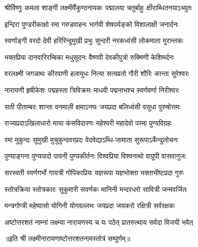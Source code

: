 
\twolineshloka
{श्रीर्विष्णुः कमला शार्ङ्गी लक्ष्मीर्वैकुण्ठनायकः}
{पद्मालया चतुर्बाहुः क्षीराब्धितनयाऽच्युतः}%

\twolineshloka
{इन्दिरा पुण्डरीकाक्षो रमा गरुडवाहनः}
{भार्गवी शेषपर्यङ्को विशालाक्षी जनार्दनः}%

\twolineshloka
{स्वर्णाङ्गी वरदो देवी हरिरिन्दुमुखी प्रभुः}
{सुन्दरी नरकध्वंसी लोकमाता मुरान्तकः}%

\twolineshloka
{भक्तप्रिया दानवारिरम्बिका मधुसूदनः}
{वैष्णवी देवकीपुत्रो रुक्मिणी केशिमर्दनः}%

\twolineshloka
{वरलक्ष्मी जगन्नाथः कीरवाणी हलायुधः}
{नित्या सत्यव्रतो गौरी शौरिः कान्ता सुरेश्वरः}

\twolineshloka
{नारायणी हृषीकेशः पद्महस्ता त्रिविक्रमः}
{माधवी पद्मनाभश्च स्वर्णवर्णा निरीश्वरः}

\twolineshloka
{सती पीताम्बरः शान्ता वनमाली क्षमाऽनघः}
{जयप्रदा बलिध्वंसी वसुधा पुरुषोत्तमः}

\twolineshloka
{राज्यप्रदाऽखिलाधारो माया कंसविदारणः}
{महेश्वरी महादेवो परमा पुण्यविग्रहः}


\twolineshloka
{रमा मुकुन्दः सुमुखी मुचुकुन्दवरप्रदः}
{वेदवेद्याऽब्धि-जामाता सुरूपाऽर्केन्दुलोचनः }

\twolineshloka
{पुण्याङ्गना पुण्यपादो पावनी पुण्यकीर्तनः}
{विश्वप्रिया विश्वनाथो वाग्रूपी वासवानुजः}

\twolineshloka
{सरस्वती स्वर्णगर्भो गायत्री गोपिकाप्रियः}
{यज्ञरूपा यज्ञभोक्ता भक्ताभीष्टप्रदा गुरुः}

\twolineshloka
{स्तोत्रक्रिया स्तोत्रकारः सुकुमारी सवर्णकः}
{मानिनी मन्दरधरो सावित्री जन्मवर्जितः}

\twolineshloka
{मन्त्रगोप्त्री महेष्वासो योगिनी योगवल्लभः}
{जयप्रदा जयकरो रक्षित्री सर्वरक्षकः}

\twolineshloka
{अष्टोत्तरशतं नाम्नां लक्ष्म्या नारायणस्य च}
{यः पठेत् प्रातरुत्थाय सर्वदा विजयी भवेत्}

॥इति श्री लक्ष्मीनारायणाष्टोत्तरशतनामस्तोत्रं सम्पूर्णम्॥
